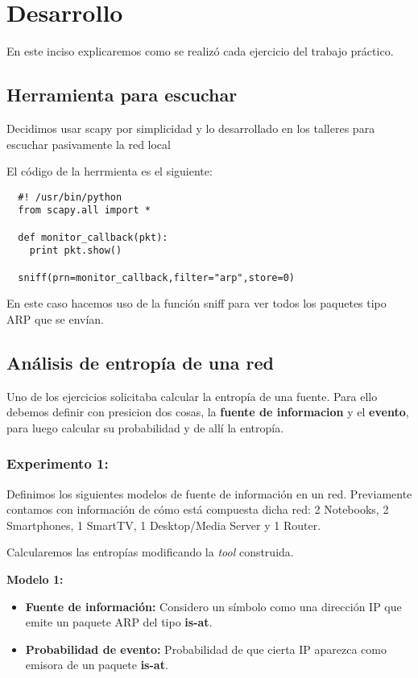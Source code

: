 \section{Desarrollo}
En este inciso explicaremos como se realizó cada ejercicio del trabajo práctico.

\subsection{Herramienta para escuchar}
Decidimos usar scapy por simplicidad y lo desarrollado en los talleres para escuchar pasivamente la red local

El código de la herrmienta es el siguiente:

\begin{center}
 \begin{verbatim}
  #! /usr/bin/python
  from scapy.all import *

  def monitor_callback(pkt):
    print pkt.show()

  sniff(prn=monitor_callback,filter="arp",store=0)
 \end{verbatim}

\end{center}

En este caso hacemos uso de la función sniff para ver todos los paquetes tipo ARP que se envían.


\subsection{Análisis de entropía de una red}
Uno de los ejercicios solicitaba calcular la entropía de una fuente.
Para ello debemos definir con presicion dos cosas, la \textbf{fuente de informacion} y el \textbf{evento}, para luego calcular su probabilidad
y de allí la entropía.

\subsubsection{Experimento 1:}

Definimos los siguientes modelos de fuente de información en un red. Previamente contamos con información de cómo está compuesta dicha red: 2 Notebooks, 2 Smartphones, 1 SmartTV, 1 Desktop/Media Server y 1 Router.

Calcularemos las entropías modificando la \textit{tool} construida. 

\textbf{Modelo 1:}
\begin{itemize}
\item \textbf{Fuente de información:} Considero un símbolo como una dirección IP que emite un paquete ARP del tipo \textbf{is-at}.
\item \textbf{Probabilidad de evento:} Probabilidad de que cierta IP aparezca como emisora de un paquete \textbf{is-at}.
\end{itemize}

